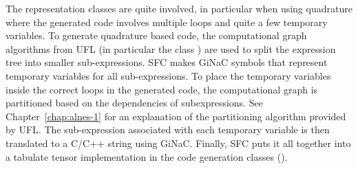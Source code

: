 The representation classes are quite involved, in particular when
using quadrature where the generated code involves multiple loops and
quite a few temporary variables. To generate quadrature based code,
the computational graph algorithms from UFL (in particular the class
) are used to split the expression tree into smaller
sub-expressions.  SFC makes GiNaC symbols that represent temporary
variables for all sub-expressions.  To place the temporary variables
inside the correct loops in the generated code, the computational
graph is partitioned based on the dependencies of subexpressions. See
Chapter~\ref{chap:alnes-1} for an explanation of the partitioning
algorithm provided by UFL.  The sub-expression associated with
each temporary variable is then translated to a C/C++ string using
GiNaC. Finally, SFC puts it all together into a tabulate tensor
implementation in the code generation classes ().
